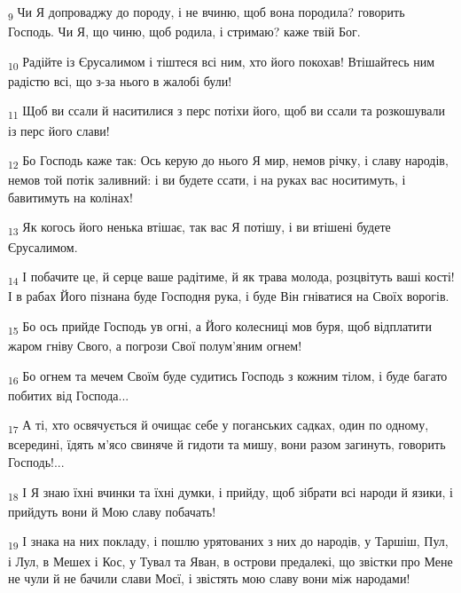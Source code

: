 \begin{tcolorbox}
\textsubscript{9} Чи Я допроваджу до породу, і не вчиню, щоб вона породила? говорить Господь. Чи Я, що чиню, щоб родила, і стримаю? каже твій Бог.
\end{tcolorbox}
\begin{tcolorbox}
\textsubscript{10} Радійте із Єрусалимом і тіштеся всі ним, хто його покохав! Втішайтесь ним радістю всі, що з-за нього в жалобі були!
\end{tcolorbox}
\begin{tcolorbox}
\textsubscript{11} Щоб ви ссали й наситилися з перс потіхи його, щоб ви ссали та розкошували із перс його слави!
\end{tcolorbox}
\begin{tcolorbox}
\textsubscript{12} Бо Господь каже так: Ось керую до нього Я мир, немов річку, і славу народів, немов той потік заливний: і ви будете ссати, і на руках вас носитимуть, і бавитимуть на колінах!
\end{tcolorbox}
\begin{tcolorbox}
\textsubscript{13} Як когось його ненька втішає, так вас Я потішу, і ви втішені будете Єрусалимом.
\end{tcolorbox}
\begin{tcolorbox}
\textsubscript{14} І побачите це, й серце ваше радітиме, й як трава молода, розцвітуть ваші кості! І в рабах Його пізнана буде Господня рука, і буде Він гніватися на Своїх ворогів.
\end{tcolorbox}
\begin{tcolorbox}
\textsubscript{15} Бо ось прийде Господь ув огні, а Його колесниці мов буря, щоб відплатити жаром гніву Свого, а погрози Свої полум'яним огнем!
\end{tcolorbox}
\begin{tcolorbox}
\textsubscript{16} Бо огнем та мечем Своїм буде судитись Господь з кожним тілом, і буде багато побитих від Господа...
\end{tcolorbox}
\begin{tcolorbox}
\textsubscript{17} А ті, хто освячується й очищає себе у поганських садках, один по одному, всередині, їдять м'ясо свиняче й гидоти та мишу, вони разом загинуть, говорить Господь!...
\end{tcolorbox}
\begin{tcolorbox}
\textsubscript{18} І Я знаю їхні вчинки та їхні думки, і прийду, щоб зібрати всі народи й язики, і прийдуть вони й Мою славу побачать!
\end{tcolorbox}
\begin{tcolorbox}
\textsubscript{19} І знака на них покладу, і пошлю урятованих з них до народів, у Таршіш, Пул, і Лул, в Мешех і Кос, у Тувал та Яван, в острови предалекі, що звістки про Мене не чули й не бачили слави Моєї, і звістять мою славу вони між народами!
\end{tcolorbox}
